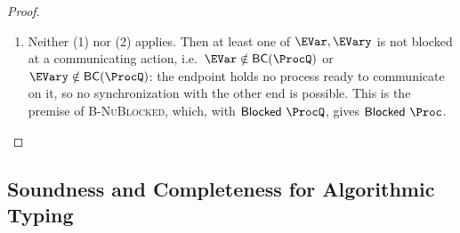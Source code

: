 \begin{proof}
\begin{itemize}
\begin{enumerate}
          \textsc{R-Com}, \textsc{R-Choice}, resp.\ \textsc{R-Close}.
        \item Neither (1) nor (2) applies. Then at least one of $\EVar,\EVary$ is
          not blocked at a communicating action, i.e.\ $\EVar \notin \BC(\ProcQ)$
          or $\EVary \notin \BC(\ProcQ)$: the endpoint holds no process ready to
          communicate on it, so no synchronization with the other end is
          possible. This is the premise of \textsc{B-NuBlocked}, which, with
          $\Blocked\ProcQ$, gives $\Blocked\Proc$.
      \end{enumerate}
  \end{itemize}
\end{proof}

\subsection{Soundness and Completeness for Algorithmic Typing}
\label{sec:appendix-metatheory-sc}

